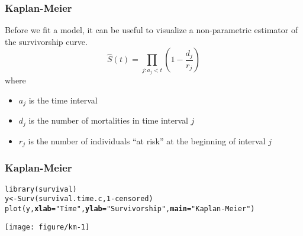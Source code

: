 \documentclass[color=usenames,dvipsnames]{beamer}\usepackage[]{graphicx}\usepackage[]{color}
\makeatletter
\newcommand{\hlnum}[1]{\textcolor[rgb]{0.69,0.494,0}{#1}}%
\newcommand{\hlstr}[1]{\textcolor[rgb]{0.749,0.012,0.012}{#1}}%
\newcommand{\hlopt}[1]{\textcolor[rgb]{0,0,0}{#1}}%
\newcommand{\hlstd}[1]{\textcolor[rgb]{0,0,0}{#1}}%
\newcommand{\hlkwb}[1]{\textcolor[rgb]{0,0.341,0.682}{#1}}%
\newcommand{\hlkwc}[1]{\textcolor[rgb]{0,0,0}{\textbf{#1}}}%
\newcommand{\hlkwd}[1]{\textcolor[rgb]{0.004,0.004,0.506}{#1}}%
\newenvironment{kframe}{%
 \def\at@end@of@kframe{}%
 \ifinner\ifhmode%
  \def\at@end@of@kframe{\end{minipage}}%
  \begin{minipage}{\columnwidth}%
 \fi\fi%
 \def\FrameCommand##1{\hskip\@totalleftmargin \hskip-\fboxsep
 \colorbox{shadecolor}{##1}\hskip-\fboxsep
     \hskip-\linewidth \hskip-\@totalleftmargin \hskip\columnwidth}%
 \MakeFramed {\advance\hsize-\width
   \@totalleftmargin\z@ \linewidth\hsize
   \@setminipage}}%
 {\par\unskip\endMakeFramed%
 \at@end@of@kframe}
\newenvironment{knitrout}{}{} %
\makeatother
\begin{document}
\begin{frame}[fragile]
  \frametitle{Kaplan-Meier}
  Before we fit a model, it can be useful to visualize a
  non-parametric estimator of the survivorship curve. \\
  \pause
  \vfill
  \[
    \hat{S}(t) = \prod_{j:a_j < t} \left(1 - \frac{d_j}{r_j}\right)
  \]
  where
  \begin{itemize}
    \item $a_j$ is the time interval
    \item $d_j$ is the number of mortalities in time interval $j$
    \item $r_j$ is the number of individuals ``at risk'' at the
      beginning of interval $j$
  \end{itemize}
\end{frame}



\begin{frame}[fragile]
  \frametitle{Kaplan-Meier}
\begin{knitrout}\footnotesize
{}\color{fgcolor}\begin{kframe}
\begin{alltt}
\hlkwd{library}\hlstd{(survival)}
\hlstd{y} \hlkwb{<-} \hlkwd{Surv}\hlstd{(survival.time.c,} \hlnum{1}\hlopt{-}\hlstd{censored)}
\hlkwd{plot}\hlstd{(y,} \hlkwc{xlab}\hlstd{=}\hlstr{"Time"}\hlstd{,} \hlkwc{ylab}\hlstd{=}\hlstr{"Survivorship"}\hlstd{,} \hlkwc{main}\hlstd{=}\hlstr{"Kaplan-Meier"}\hlstd{)}
\end{alltt}
\end{kframe}

{\centering \texttt{[image: figure/km-1]} 

}


\end{knitrout}
\end{frame}
\end{document}
